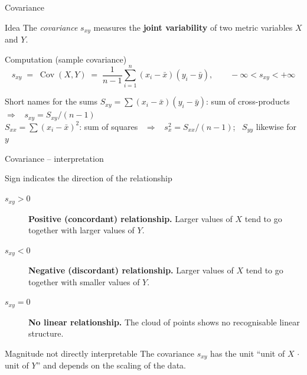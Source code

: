 \documentclass[aspectratio=169,11pt]{beamer}
\begin{document}
\begin{frame}{Covariance}
  \begin{block}{Idea}
    The \emph{covariance} $s_{xy}$ measures the
    \textbf{joint variability} of two metric variables $X$ and $Y$.
  \end{block}

  \begin{block}{Computation (sample covariance)}
    \[
      s_{xy} \;=\; \operatorname{Cov}(X, Y)
             \;=\; \frac{1}{n-1} \sum_{i=1}^{n}
                   (x_i - \bar{x})(y_i - \bar{y}),
      \qquad -\infty < s_{xy} < +\infty
    \]
    \vspace{-10pt}
  \end{block}
  \begin{block}{Short names for the sums}
    \small
    $S_{xy} = \sum (x_i - \bar{x})(y_i - \bar{y})$: sum of cross-products
    \ $\Rightarrow$ \ $s_{xy} = S_{xy}/(n-1)$\\[2pt]
    $S_{xx} = \sum (x_i - \bar{x})^{2}$: sum of squares
    \ $\Rightarrow$ \ $s_x^{2} = S_{xx}/(n-1)$; \ $S_{yy}$ likewise for $y$
  \end{block}
\end{frame}

\begin{frame}{Covariance -- interpretation}
  \begin{block}{Sign indicates the direction of the relationship}
    \begin{description}
      \item[$s_{xy} > 0$] \textbf{Positive (concordant) relationship.}
            Larger values of $X$ tend to go together with larger values
            of $Y$.
      \item[$s_{xy} < 0$] \textbf{Negative (discordant) relationship.}
            Larger values of $X$ tend to go together with smaller values
            of $Y$.
      \item[$s_{xy} = 0$] \textbf{No linear relationship.}
            The cloud of points shows no recognisable linear structure.
    \end{description}
  \end{block}

  \begin{alertblock}{Magnitude not directly interpretable}
    The covariance $s_{xy}$ has the unit ``unit of $X$ $\cdot$ unit of
    $Y$'' and depends on the scaling of the data.
  \end{alertblock}
\end{frame}
\end{document}
